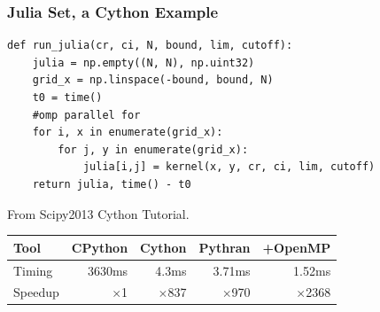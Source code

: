 \documentclass[aspectratio=1610]{beamer}
\begin{document}
\begin{frame}[fragile]
    \frametitle{Julia Set, a Cython Example}

\begin{lstlisting}
def run_julia(cr, ci, N, bound, lim, cutoff):
    julia = np.empty((N, N), np.uint32)
    grid_x = np.linspace(-bound, bound, N)
    t0 = time()
    #omp parallel for
    for i, x in enumerate(grid_x):
        for j, y in enumerate(grid_x):
            julia[i,j] = kernel(x, y, cr, ci, lim, cutoff)
    return julia, time() - t0
\end{lstlisting}
From Scipy2013 Cython Tutorial.
\vfill
    \begin{tabular}{|l|r|r|r|r|}
        \hline
        Tool    &  CPython    &  Cython  &  Pythran & +OpenMP   \\
        \hline
        Timing  &  3630ms    &   4.3ms  &   3.71ms  & 1.52ms  \\
        \hline
        Speedup & $\times$1 &  $\times$837 &  $\times$970 & $\times$2368   \\
        \hline
    \end{tabular}

\end{frame}
\end{document}
